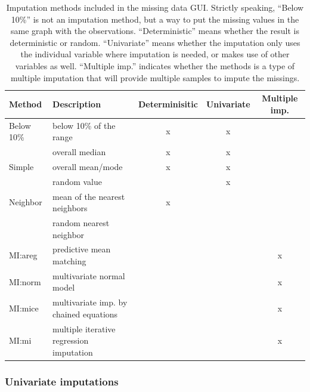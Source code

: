 \documentclass[article]{jss}
\begin{document}
\begin{center}
\begin{table}[h]
\begin{centering}
\begin{tabular}{l|l|c|c|c}
\hline 
\textbf{\scriptsize{Method}} & \textbf{\scriptsize{Description}} & \textbf{\scriptsize{Determinisitic}} & \textbf{\scriptsize{Univariate}} & \textbf{\scriptsize{Multiple imp.}}\tabularnewline
\hline 
{\scriptsize{Below 10\%}} & {\scriptsize{below 10\% of the range}} & {\scriptsize{x}} & {\scriptsize{x}} & \tabularnewline
\hline 
 & {\scriptsize{overall median}} & {\scriptsize{x}} & {\scriptsize{x}} & \tabularnewline
{\scriptsize{Simple}} & {\scriptsize{overall mean/mode}} & {\scriptsize{x}} & {\scriptsize{x}} & \tabularnewline 
 & {\scriptsize{random value}} &  & {\scriptsize{x}} & \tabularnewline
\hline
{\scriptsize{Neighbor}} & {\scriptsize{mean of the nearest neighbors}} & {\scriptsize{x}} &  & \tabularnewline
 & {\scriptsize{random nearest neighbor}} &  &  & \tabularnewline
\hline 
{\scriptsize{MI:areg}} & {\scriptsize{predictive mean matching}} &  &  & {\scriptsize{x}}\tabularnewline
\hline 
{\scriptsize{MI:norm}} & {\scriptsize{multivariate normal model}} &  &  & {\scriptsize{x}}\tabularnewline
\hline 
{\scriptsize{MI:mice}} & {\scriptsize{multivariate imp. by chained equations}} &  &  & {\scriptsize{x}}\tabularnewline
\hline 
{\scriptsize{MI:mi}} & {\scriptsize{multiple iterative regression imputation}} &  &  & {\scriptsize{x}}\tabularnewline
\hline 
\end{tabular}
\par\end{centering}
\caption{Imputation methods included in the missing data GUI. Strictly speaking, 
``Below 10\%'' is not an imputation method, but a way to put the missing 
values in the same graph with the observations. ``Deterministic''
means whether the result is deterministic or random. ``Univariate''
means whether the imputation only uses the individual variable where
imputation is needed, or makes use of other variables as well. ``Multiple
imp.'' indicates whether the methods is a type of multiple imputation that 
will provide multiple samples to impute the missings.}
\label{tab:compare-methods}
\end{table}
\par\end{center}


\subsubsection{Univariate imputations}
\end{document}
